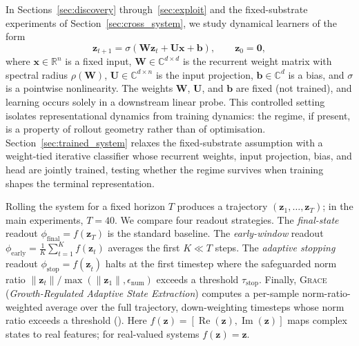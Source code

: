 \documentclass{article}
\theoremstyle{remark}
\newcommand{\R}{\mathbb{R}}
\newcommand{\C}{\mathbb{C}}
\newcommand{\bz}{\mathbf{z}}
\newcommand{\bx}{\mathbf{x}}
\newcommand{\bW}{\mathbf{W}}
\newcommand{\bU}{\mathbf{U}}
\newcommand{\grace}{\textnormal{\textsc{Grace}}}
\newcommand{\sr}{\rho(\bW)}
\begin{document}
In Sections~\ref{sec:discovery} through~\ref{sec:exploit} and the
fixed-substrate experiments of Section~\ref{sec:cross_system},
we study dynamical learners of the form
\begin{equation}
    \bz_{t+1} = \sigma(\bW \bz_t + \bU \bx + \mathbf{b}),
    \qquad \bz_0 = \mathbf{0},
    \label{eq:dynamics}
\end{equation}
where $\bx \in \R^n$ is a fixed input, $\bW \in \C^{d \times d}$ is the
recurrent weight matrix with spectral radius $\sr$, $\bU \in \C^{d \times n}$
is the input projection, $\mathbf{b}\in\C^d$ is a bias, and $\sigma$ is a
pointwise nonlinearity. The weights $\bW$, $\bU$, and $\mathbf{b}$ are fixed
(not trained), and learning occurs solely in a downstream linear probe. This
controlled setting isolates representational dynamics from training dynamics:
the regime, if present, is a property of rollout geometry rather than of
optimisation. Section~\ref{sec:trained_system} relaxes the fixed-substrate
assumption with a weight-tied iterative classifier whose recurrent weights,
input projection, bias, and head are jointly trained, testing whether the
regime survives when training shapes the terminal representation.

Rolling the system for a fixed horizon $T$ produces a trajectory
$(\bz_1, \ldots, \bz_T)$; in the main experiments, $T=40$. We compare four
readout strategies. The \textit{final-state} readout
$\phi_{\text{final}} = f(\bz_T)$ is the standard baseline. The
\textit{early-window} readout
$\phi_{\text{early}} = \frac{1}{K}\sum_{t=1}^{K} f(\bz_t)$ averages the
first $K \ll T$ steps.
The \textit{adaptive stopping} readout $\phi_{\text{stop}} = f(\bz_{\hat{t}})$
halts at the first timestep where the safeguarded norm ratio
$\|\bz_t\|/\max(\|\bz_1\|,\epsilon_{\mathrm{num}})$ exceeds a threshold
$\tau_{\text{stop}}$. Finally, \grace{}
(\emph{Growth-Regulated Adaptive State Extraction}) computes a per-sample
norm-ratio-weighted average over the full trajectory, down-weighting timesteps
whose norm ratio exceeds a threshold (). Here
$f(\bz) = [\operatorname{Re}(\bz),
\operatorname{Im}(\bz)]$ maps complex states to real features; for real-valued
systems $f(\bz) = \bz$.
\end{document}
